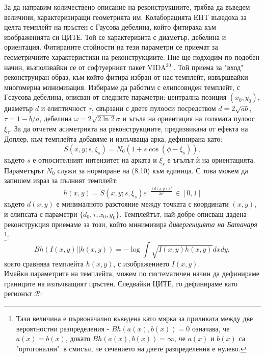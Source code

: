 За да направим количествено описание на реконструкциите, трябва да въведем величини, характеризиращи геометрията им. Колаборацията EHT въведоха за целта темплейт на пръстен с Гаусова дебелина, който фитираха към изображенията си ЦИТЕ. Той се характеризита с диаметър, дебелина и ориентация. Фитираните стойности на тези параметри се приемат за геометричните характеристики на реконструкциите. Ние ще подходим по подобен начин, възползвайки се от софтуерният пакет VIDA$^{20}$ \cite{VIDA}. Той приема за "вход"$\,$ реконструиран образ, към който фитира избран от нас темплейт, извършвайки многомерна минимизация. Избираме да работим с елипсовиден темплейт, с Гсаусова дебелина, описван от следните параметри: централна позиция $(x_0,y_0)$, диаметър $d$ и елиптичност $\tau$, свързани с двете пулооси посредством $d = 2\sqrt{ab}$, $\tau = 1 - b/a$, дебелина $\mathcal{\omega} = 2\sqrt{2\ln2}\sigma$ и ъгъла на ориентация на голямата пулоос $\xi_\tau$. За да отчетем асиметрията на реконструкциите, предизвикана от ефекта на Доплер, към темплейта добавяме и излъчваща арка, дефинирана като:
\begin{equation}
	S(x,y;s,\xi_s) = N_0(1 + s\cos(\phi - \xi_s)),
\end{equation}
където $s$ е относителният интензитет на арката и $\xi_s$ е ъгълът ѝ на ориентацията. Параметърът $N_0$ служи за нормиране на (8.10) към единица. С това можем да запишем израз за пълният темплейт:
\begin{equation}
	h(x,y) = S(x,y;s,\xi_s)e^{-\frac{(d(x,y))^2}{2\sigma^2}}\in[0,1]
\end{equation}
където $d(x,y)$ е минималното разстояние между точката с координати $(x,y)$, и елипсата с параметри $\{d_0,\tau,x_0,y_0\}$. Темплейтът, най-добре описващ дадена реконструкция приемаме за този, който минимизира \emph{дивергенцията на Батачаря} \footnote{Тази величина е първоначално въведена като мярка за приликата между две вероятностни разпределения - $Bh(a(x),b(x)) = 0$ означава, че $a(x) = b(x)$, докато $Bh(a(x), b(x)) = \infty$, че $a(x)$ и $b(x)$ са "ортогонални"$\,$ в смисъл, че сечението на двете разпределения е нулево.}:
\begin{equation}
	Bh\left(I(x,y)||h(x,y)\right)= -\log\int\sqrt{I(x,y)h(x,y)}dxdy,
\end{equation}
която сравнява темплейта $h(x,y)$, с изображението $I(x,y)$.\\

Имайки параметрите на темплейта, можем по систематичен начин да дефинираме границите на излъчващият пръстен. Следвайки ЦИТЕ, го дефинираме като регионът $\mathcal{R}$:

